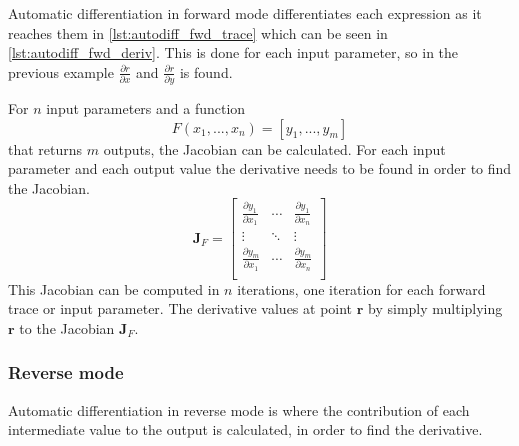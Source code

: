 Automatic differentiation in forward mode differentiates each expression as it reaches them in \autoref{lst:autodiff_fwd_trace} which can be seen in \autoref{lst:autodiff_fwd_deriv}. This is done for each input parameter, so in the previous example $\frac{\partial r}{\partial x}$ and $\frac{\partial r}{\partial y}$ is found.

For $n$ input parameters and a function $$F(x_1, ..., x_n) = [ y_1, ..., y_m ]$$ that returns $m$ outputs, the Jacobian can be calculated. For each input parameter and each output value the derivative needs to be found in order to find the Jacobian.
$$\bm{J}_F = \left[
  \begin{array}{ccc}
    \frac{\partial y_1}{\partial x_1} & \cdots & \frac{\partial y_1}{\partial x_n}\\
    \vdots & \ddots & \vdots\\
    \frac{\partial y_m}{\partial x_1} & \cdots & \frac{\partial y_m}{\partial x_n}\\
  \end{array}
\right]$$
This Jacobian can be computed in $n$ iterations, one iteration for each forward trace or input parameter.
The derivative values at point $\bm{r}$ by simply multiplying $\bm{r}$ to the Jacobian $\bm{J}_F$.

\subsubsection{Reverse mode}%
\label{ssub:reverse_mode}

Automatic differentiation in reverse mode is where the contribution of each intermediate value to the output is calculated, in order to find the derivative.




